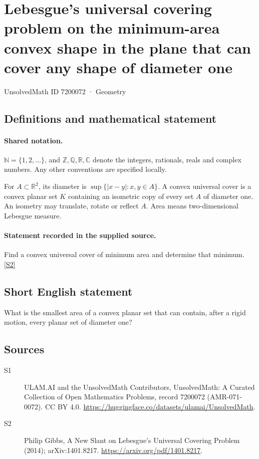 \documentclass[11pt]{article}
\newcommand{\sref}[2]{\hyperlink{source:#1:#2}{[S#2]}}
\begin{document}
\setcounter{section}{7200071}
\section{Lebesgue's universal covering problem on the minimum-area convex shape in the plane that can cover any shape of diameter one}\label{7200072}
{\small\sffamily UnsolvedMath ID 7200072 · Geometry}
\subsection{Definitions and mathematical statement}

\paragraph{Shared notation.}$\mathbb N=\{1,2,\ldots\}$, and $\mathbb Z,\mathbb Q,\mathbb R,\mathbb C$ denote the integers, rationals, reals and complex numbers. Any other conventions are specified locally.


For $A\subset\mathbb R^2$, its diameter is $\sup\{|x-y|:x,y\in A\}$. A convex universal cover is a convex planar set $K$ containing an isometric copy of every set $A$ of diameter one. An isometry may translate, rotate or reflect $A$. Area means two-dimensional Lebesgue measure.
\paragraph{Statement recorded in the supplied source.}
Find a convex universal cover of minimum area and determine that minimum. \sref{7200072}{2}
\subsection{Short English statement}
What is the smallest area of a convex planar set that can contain, after a rigid motion, every planar set of diameter one?
\subsection{Sources}
\begin{description}
\item[\hypertarget{source:7200072:1}{S1}] ULAM.AI and the UnsolvedMath Contributors, UnsolvedMath: A Curated Collection of Open Mathematics Problems, record 7200072 (AMR-071-0072). CC BY 4.0. \url{https://huggingface.co/datasets/ulamai/UnsolvedMath}.
\item[\hypertarget{source:7200072:2}{S2}] Philip Gibbs, A New Slant on Lebesgue’s Universal Covering Problem (2014); arXiv:1401.8217. \url{https://arxiv.org/pdf/1401.8217}.
\end{description}
\label{end:7200072}
\end{document}
